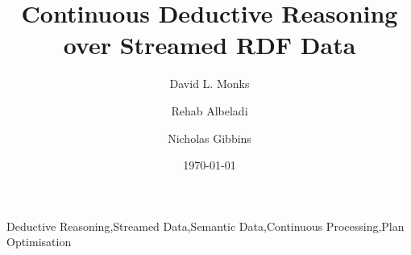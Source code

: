 \begin{frontmatter}
	\title{Continuous Deductive Reasoning over Streamed RDF Data}

	\author{David L. Monks}
	\author{Rehab Albeladi}
	\author{Nicholas Gibbins}
	\address{
	          Department of Electronics and Computer Science,\\
	          Faculty of Physical Sciences and Engineering,\\
	          University of Southampton,\\
	          University Rd., Southampton, SO17 1BJ,\\
	          United Kingdom
	}

	\begin{abstract}
		
	\end{abstract}

	\begin{keyword}
	      Deductive Reasoning\sep Streamed Data\sep Semantic Data\sep Continuous Processing\sep Plan Optimisation
	\end{keyword}

	\date{\today}

\end{frontmatter}
